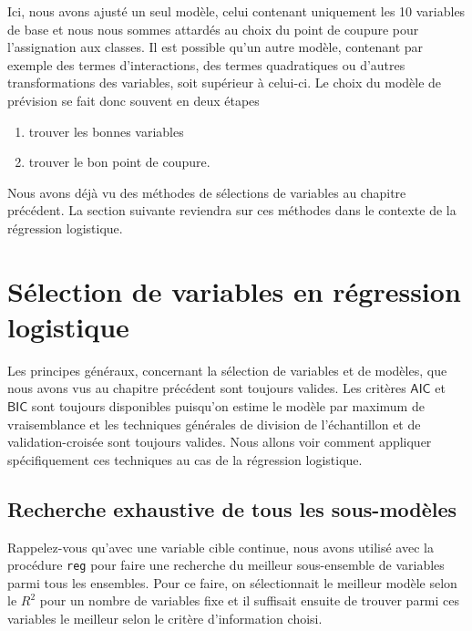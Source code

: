 \documentclass[
  11pt,
  letterpaper,
]{book}
\providecommand{\tightlist}{%
  \setlength{\itemsep}{0pt}\setlength{\parskip}{0pt}}
\theoremstyle{definition}
\theoremstyle{definition}
\theoremstyle{definition}
\theoremstyle{remark}
\begin{document}
Ici, nous avons ajusté un seul modèle, celui contenant uniquement les 10 variables de base et nous nous sommes attardés au choix du point de coupure pour l'assignation aux classes. Il est possible qu'un autre modèle, contenant par exemple des termes d'interactions, des termes quadratiques ou d'autres transformations des variables, soit supérieur à celui-ci. Le choix du modèle de prévision se fait donc souvent en deux étapes

\begin{enumerate}
\def\labelenumi{\arabic{enumi}.}
\tightlist
\item
  trouver les bonnes variables
\item
  trouver le bon point de coupure.
\end{enumerate}

Nous avons déjà vu des méthodes de sélections de variables au chapitre précédent. La section suivante reviendra sur ces méthodes dans le contexte de la régression logistique.

\hypertarget{suxe9lection-de-variables-en-ruxe9gression-logistique}{%
\section{Sélection de variables en régression logistique}\label{suxe9lection-de-variables-en-ruxe9gression-logistique}}

Les principes généraux, concernant la sélection de variables et de modèles, que nous avons vus au chapitre précédent sont toujours valides. Les critères \(\mathsf{AIC}\) et \(\mathsf{BIC}\) sont toujours disponibles puisqu'on estime le modèle par maximum de vraisemblance et les techniques générales de division de l'échantillon et de validation-croisée sont toujours valides. Nous allons voir comment appliquer spécifiquement ces techniques au cas de la régression logistique.

\hypertarget{recherche-exhaustive-de-tous-les-sous-moduxe8les}{%
\subsection{Recherche exhaustive de tous les sous-modèles}\label{recherche-exhaustive-de-tous-les-sous-moduxe8les}}

Rappelez-vous qu'avec une variable cible continue, nous avons utilisé avec la procédure \texttt{reg} pour faire une recherche du meilleur sous-ensemble de variables parmi tous les ensembles. Pour ce faire, on sélectionnait le meilleur modèle selon le \(R^2\) pour un nombre de variables fixe et il suffisait ensuite de trouver parmi ces variables le meilleur selon le critère d'information choisi.
\end{document}
